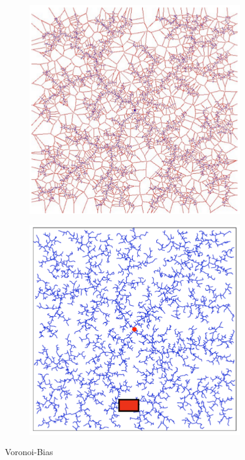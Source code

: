 \begin{figure}[h!]
\begin{subfigure}{.3\textwidth}
	\end{subfigure}
	\begin{subfigure}{.3\textwidth}
		\includegraphics[width=\textwidth]{figures/ch04_voron5.png}
	\end{subfigure}
	\begin{subfigure}{.3\textwidth}
		\includegraphics[width=\textwidth]{figures/ch04_voron6.png}
	\end{subfigure}
	\caption{Voronoi-Bias}
	\label{fig:vb1}
\end{figure}
